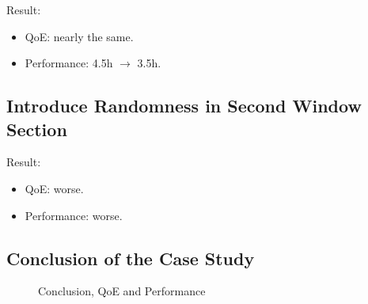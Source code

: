 \documentclass[11pt,a4paper]{article}
\begin{document}
Result:
\begin{itemize}
	\item QoE: nearly the same. 
	\item Performance: 4.5h $\rightarrow$ 3.5h. 
\end{itemize}

\subsection{Introduce Randomness in Second Window Section}

Result:
\begin{itemize}
	\item QoE: worse. 
	\item Performance: worse. 
\end{itemize}

\subsection{Conclusion of the Case Study}

\begin{figure}
	\caption{Conclusion, QoE and Performance}
\end{figure}
\end{document}
